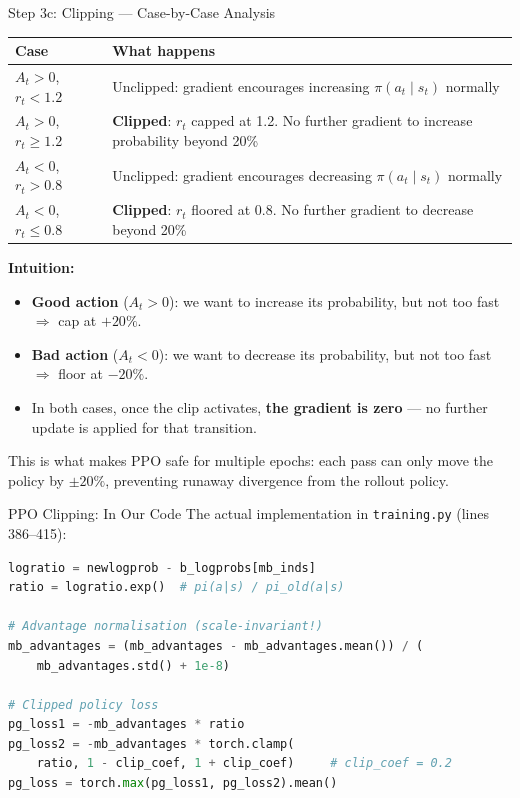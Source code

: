 \documentclass[aspectratio=169,11pt]{beamer}
\begin{document}
\begin{frame}{Step 3c: Clipping --- Case-by-Case Analysis}
  \small
  \begin{tabular}{lp{9.5cm}}
    \toprule
    \textbf{Case} & \textbf{What happens} \\
    \midrule
    $A_t > 0$, $r_t < 1.2$ & Unclipped: gradient encourages increasing $\pi(a_t \mid s_t)$ normally \\[3pt]
    $A_t > 0$, $r_t \ge 1.2$ & \textbf{Clipped}: $r_t$ capped at 1.2. No further gradient to increase probability beyond 20\% \\[3pt]
    $A_t < 0$, $r_t > 0.8$ & Unclipped: gradient encourages decreasing $\pi(a_t \mid s_t)$ normally \\[3pt]
    $A_t < 0$, $r_t \le 0.8$ & \textbf{Clipped}: $r_t$ floored at 0.8. No further gradient to decrease beyond 20\% \\
    \bottomrule
  \end{tabular}

  \bigskip
  \textbf{Intuition:}
  \begin{itemize}\setlength\itemsep{3pt}
    \item \textbf{Good action} ($A_t > 0$): we want to increase its probability, but not
      too fast $\Rightarrow$ cap at $+20\%$.
    \item \textbf{Bad action} ($A_t < 0$): we want to decrease its probability, but not
      too fast $\Rightarrow$ floor at $-20\%$.
    \item In both cases, once the clip activates, \textbf{the gradient is zero} ---
      no further update is applied for that transition.
  \end{itemize}

  \medskip
  This is what makes PPO safe for multiple epochs: each pass can only move the policy
  by $\pm 20\%$, preventing runaway divergence from the rollout policy.
\end{frame}

\begin{frame}[fragile]{PPO Clipping: In Our Code}
  \small
  The actual implementation in \texttt{training.py} (lines 386--415):

  \begin{lstlisting}[language=python]
logratio = newlogprob - b_logprobs[mb_inds]
ratio = logratio.exp()  # pi(a|s) / pi_old(a|s)

# Advantage normalisation (scale-invariant!)
mb_advantages = (mb_advantages - mb_advantages.mean()) / (
    mb_advantages.std() + 1e-8)

# Clipped policy loss
pg_loss1 = -mb_advantages * ratio
pg_loss2 = -mb_advantages * torch.clamp(
    ratio, 1 - clip_coef, 1 + clip_coef)     # clip_coef = 0.2
pg_loss = torch.max(pg_loss1, pg_loss2).mean()
  \end{lstlisting}

\end{frame}
\end{document}
